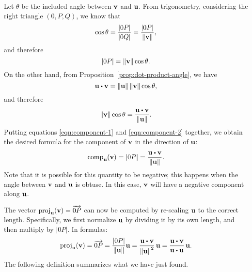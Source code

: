 Let $\theta$ be the included angle between $\vect{v}$ and
$\vect{u}$. From trigonometry, considering the right triangle
$(0,P,Q)$, we know that
\begin{equation*}
  \cos \theta = \frac{|0P|}{|0Q|} = \frac{|0P|}{\norm{\vect{v}}},
\end{equation*}
and therefore
\begin{equation}\label{eqn:component-1}
  |0P| = \norm{\vect{v}} \cos \theta.
\end{equation}
On the other hand, from Proposition~\ref{prop:dot-product-angle},  we
have
\begin{equation*}
  \vect{u}\dotprod \vect{v}=\norm{\vect{u}} \norm{\vect{v}} \cos \theta,
\end{equation*}
and therefore
\begin{equation}\label{eqn:component-2}
  \norm{\vect{v}} \cos \theta = \frac{\vect{u}\dotprod \vect{v}}{\norm{\vect{u}}}.
\end{equation}
Putting equations {\eqref{eqn:component-1}} and
{\eqref{eqn:component-2}} together, we obtain the desired formula for
the component of $\vect{v}$ in the direction of $\vect{u}$:
\begin{equation}\label{eqn:component}
  \comp_{\vect{u}}(\vect{v})
  = |0P|
  = \frac{\vect{u}\dotprod \vect{v}}{\norm{\vect{u}}}.
\end{equation}
Note that it is possible for this quantity to be negative; this
happens when the angle between $\vect{v}$ and $\vect{u}$ is obtuse.
In this case, $\vect{v}$ will have a negative component along
$\vect{u}$.

The vector $\proj_{\vect{u}}(\vect{v})=\longvect{0P}$ can now be
computed by re-scaling $\vect{u}$ to the correct length. Specifically,
we first normalize $\vect{u}$ by dividing it by its own length, and
then multiply by $|0P|$. In formulas:
\begin{equation}
  \proj_{\vect{u}}(\vect{v})
  = \longvect{0P}
  = \frac{|0P|}{\norm{\vect{u}}}\vect{u}
  = \frac{\vect{u}\dotprod \vect{v}}{\norm{\vect{u}}^2}\,\vect{u}
  = \frac{\vect{u}\dotprod \vect{v}}{\vect{u}\dotprod \vect{u}}\,\vect{u}.
\end{equation}
The following definition summarizes what we have just found.

